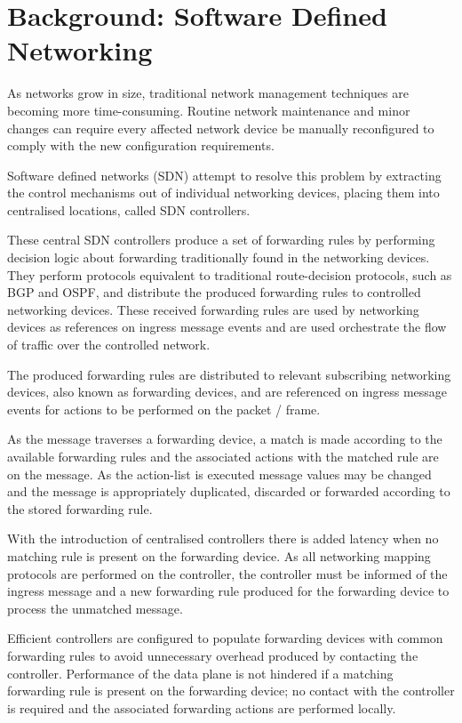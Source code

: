 \chapter{Background: Software Defined Networking}
As networks grow in size, traditional network management techniques are becoming more time-consuming. Routine network maintenance and minor changes can require every affected network device be manually reconfigured to comply with the new configuration requirements.

Software defined networks (SDN) attempt to resolve this problem by extracting the control mechanisms out of individual networking devices, placing them into centralised locations, called SDN controllers.\cite{computer_world_sdn} 

These central SDN controllers produce a set of forwarding rules by performing decision logic about forwarding traditionally found in the networking devices. They perform protocols equivalent to traditional route-decision protocols, such as BGP and OSPF, and distribute the produced forwarding rules to controlled networking devices. These received forwarding rules are used by networking devices as references on ingress message events and are used orchestrate the flow of traffic over the controlled network.

The produced forwarding rules are distributed to relevant subscribing networking devices, also known as forwarding devices, and are referenced on ingress message events for actions to be performed on the packet / frame.

As the message traverses a forwarding device, a match is made according to the available forwarding rules and the associated actions with the matched rule are on the message. As the action-list is executed message values may be changed and the message is appropriately duplicated, discarded or forwarded according to the stored forwarding rule. 

With the introduction of centralised controllers there is added latency when no matching rule is present on the forwarding device. As all networking mapping protocols are performed on the controller, the controller must be informed of the ingress message and a new forwarding rule produced for the forwarding device to process the unmatched message.

Efficient controllers are configured to populate forwarding devices with common forwarding rules to avoid unnecessary overhead produced by contacting the controller. Performance of the data plane is not hindered if a matching forwarding rule is present on the forwarding device; no contact with the controller is required and the associated forwarding actions are performed locally. \cite{cisco_sdn_overview}

